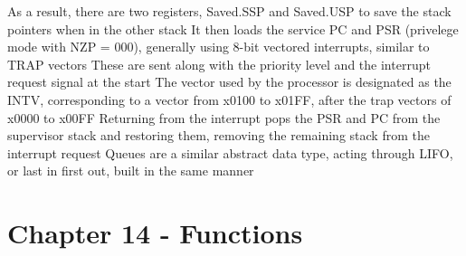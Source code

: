 \documentclass[11 pt, twoside]{article}
\newenvironment{outline*}
{
	\begin{outline}[enumerate]
	}
	{\end{outline}
}
\begin{document}
\begin{outline*}
\4 As a result, there are two registers, Saved.SSP and Saved.USP to save the stack pointers when in the other stack
\2 It then loads the service PC and PSR (privelege mode with NZP = 000), generally using 8-bit vectored interrupts, similar to TRAP vectors
\3 These are sent along with the priority level and the interrupt request signal at the start
\3 The vector used by the processor is designated as the INTV, corresponding to a vector from x0100 to x01FF, after the trap vectors of x0000 to x00FF
\2 Returning from the interrupt pops the PSR and PC from the supervisor stack and restoring them, removing the remaining stack from the interrupt request
\1 Queues are a similar abstract data type, acting through LIFO, or last in first out, built in the same manner
\end{outline*}
\section{Chapter 14 - Functions}
\end{document}
